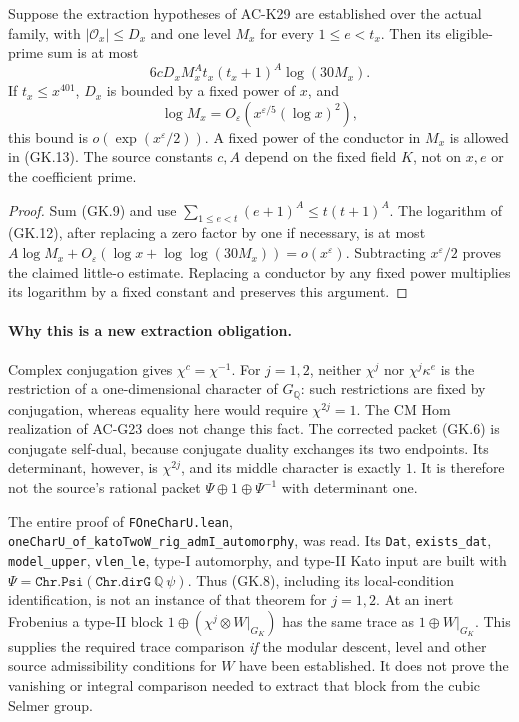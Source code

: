 \begin{corollary}
\label{AC-K29-budget}
Suppose the extraction hypotheses of AC-K29 are established over
the actual family, with $|\mathcal O_x|\le D_x$ and one level
$M_x$ for every $1\le e<t_x$.  Then its eligible-prime sum is at most
\[
 6cD_x M_x^A t_x(t_x+1)^A\log(30M_x).                       \tag{GK.12}
\]
If $t_x\le x^{401}$, $D_x$ is bounded by a fixed power of $x$,
and
\[
 \log M_x=O_\varepsilon(x^{\varepsilon/5}(\log x)^2),          \tag{GK.13}
\]
this bound is $o(\exp(x^\varepsilon/2))$.
A fixed power of the conductor in $M_x$ is allowed in (GK.13).
The source constants $c,A$ depend on the fixed field $K$,
not on $x,e$ or the coefficient prime.
\end{corollary}
\begin{proof}
Sum (GK.9) and use
$\sum_{1\le e<t}(e+1)^A\le t(t+1)^A$.
The logarithm of (GK.12), after replacing a zero factor by one
if necessary, is at most
$A\log M_x+O_\varepsilon(\log x+\log\log(30M_x))=o(x^\varepsilon)$.
Subtracting $x^\varepsilon/2$ proves the claimed little-o estimate.
Replacing a conductor by any fixed power multiplies its logarithm
by a fixed constant and preserves this argument.
\end{proof}

\paragraph{Why this is a new extraction obligation.}
Complex conjugation gives $\chi^c=\chi^{-1}$.
For $j=1,2$, neither $\chi^j$ nor $\chi^j\kappa^e$ is the
restriction of a one-dimensional character of $G_{\mathbb Q}$:
such restrictions are fixed by conjugation, whereas equality here
would require $\chi^{2j}=1$.
The CM Hom realization of AC-G23 does not change this fact.
The corrected packet (GK.6) is conjugate self-dual, because
conjugate duality exchanges its two endpoints.  Its determinant,
however, is $\chi^{2j}$, and its middle character is exactly $1$.
It is therefore not the source's rational packet
$\Psi\oplus1\oplus\Psi^{-1}$ with determinant one.

The entire proof of \texttt{FOneCharU.lean},
\texttt{oneCharU\_of\_katoTwoW\_rig\_admI\_automorphy}, was read.
Its \texttt{Dat}, \texttt{exists\_dat}, \texttt{model\_upper},
\texttt{vlen\_le}, type-I automorphy, and type-II Kato input are
built with $\Psi=\texttt{Chr.Psi}(\texttt{Chr.dirG}\ \mathbb Q\ \psi)$.
Thus (GK.8), including its local-condition identification, is not
an instance of that theorem for $j=1,2$.
At an inert Frobenius a type-II block
$1\oplus(\chi^j\otimes W|_{G_K})$ has the same trace as
$1\oplus W|_{G_K}$.  This supplies the required trace comparison
\emph{if} the modular descent, level and other source admissibility
conditions for $W$ have been established.  It does not prove the
vanishing or integral comparison needed to extract that block
from the cubic Selmer group.

